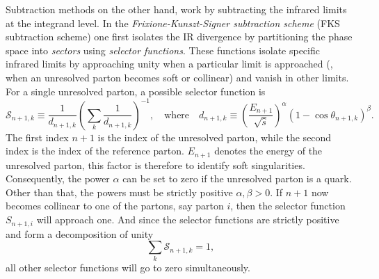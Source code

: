 Subtraction methods on the other hand, work by subtracting the infrared limits at the integrand level. In the \textit{Frixione-Kunszt-Signer subtraction scheme} (FKS subtraction scheme) one first isolates the \acs{IR} divergence by partitioning the phase space into \textit{sectors} using \textit{selector functions}. These functions isolate specific infrared limits by approaching unity when a particular limit is approached (\eg, when an unresolved parton becomes soft or collinear) and vanish in other limits. For a single unresolved parton, a possible selector function is
\begin{equation}
\mathcal{S}_{n+1,k} \equiv \frac{1}{d_{n+1,k}} \left(\sum_{k} \frac{1}{d_{n+1,k}} \right)^{-1}, \quad \text{where} \quad d_{n+1,k} \equiv \left(\frac{E_{n+1}}{\sqrt{\hat{s}}}\right)^\alpha (1 - \cos \theta_{n+1,k})^\beta.
\end{equation}
The first index $n+1$ is the index of the unresolved parton, while the second index is the index of the reference parton. $E_{n+1}$ denotes the energy of the unresolved parton, this factor is therefore to identify soft singularities. Consequently, the power $\alpha$ can be set to zero if the unresolved parton is a quark. Other than that, the powers must be strictly positive $\alpha, \beta > 0$. If $n+1$ now becomes collinear to one of the partons, say parton $i$, then the selector function $S_{n+1,i}$ will approach one. And since the selector functions are strictly positive and form a decomposition of unity
\begin{equation}
\sum_k \mathcal{S}_{n+1,k} = 1,
\end{equation}
all other selector functions will go to zero simultaneously.

